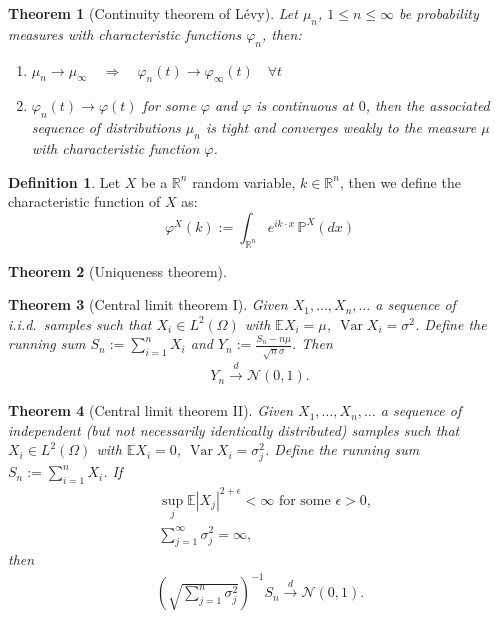 \documentclass[a4paper,11pt]{book}
\newtheorem{theorem}{Theorem}[section]
\theoremstyle{definition}
\newtheorem{definition}{Definition}[section]
\theoremstyle{remark}
\DeclareMathOperator{\var}{Var}
\begin{document}
\begin{theorem}[Continuity theorem of L\'evy]
	Let $\mu_n$, $1\leq n \leq \infty$ be probability measures with characteristic functions $\varphi_n$, then:
	\begin{enumerate}
		\item $\mu_n \rightarrow \mu_\infty \quad \Rightarrow \quad \varphi_n(t) \rightarrow \varphi_\infty(t) \quad \forall t$
		\item $\varphi_n(t) \rightarrow \varphi(t)$ for some $\varphi$ and $\varphi$ is continuous at $0$, then the associated sequence of distributions $\mu_n$ is tight and converges weakly to the measure $\mu$ with characteristic function $\varphi$.
	\end{enumerate}
\end{theorem}

\begin{definition}
Let $X$ be a $\mathbb{R}^n$ random variable, $k \in \mathbb{R}^n$, then we define the characteristic function of $X$ as:
	\begin{equation*}
		\varphi^X(k) := \int_{\mathbb{R}^n} e^{i k \cdot x} \, \mathbb{P}^X(dx)
	\end{equation*}
\end{definition}

\begin{theorem}[Uniqueness theorem]

\end{theorem}

\begin{theorem}[Central limit theorem I]
	Given $X_1, \dots, X_n, \dots$ a sequence of i.i.d.\ samples such that $X_i \in L^2(\Omega)$ with $\mathbb{E}X_i= \mu$, $\var X_i = \sigma^2$. Define the running sum $S_n:= \sum_{i = 1}^n X_i$ and $Y_n:= \frac{S_n - n \mu}{\sqrt{n} \sigma}$. Then
	\begin{align*}
		Y_n \overset{d}{\longrightarrow} \mathcal{N}(0, 1).
	\end{align*}
\end{theorem}

\begin{theorem}[Central limit theorem II]
Given $X_1, \dots, X_n, \dots$ a sequence of independent (but not necessarily identically distributed) samples such that $X_i \in L^2(\Omega)$ with $\mathbb{E}X_i= 0$, $\var X_i = \sigma^2_j$. Define the running sum $S_n:= \sum_{i = 1}^n X_i$. If
\begin{align*}
	&\sup_j \mathbb{E} |X_j|^{2 + \epsilon}< \infty \text{ for some } \epsilon >0, \\
	&\sum_{j = 1}^\infty \sigma_j^2 = \infty,
\end{align*}
then
\begin{align*}
	\left(\sqrt{\sum_{j = 1}^n \sigma_j^2}\right)^{-1} S_n \overset{d}{\longrightarrow} \mathcal{N}(0, 1).
\end{align*}
\end{theorem}
\end{document}

